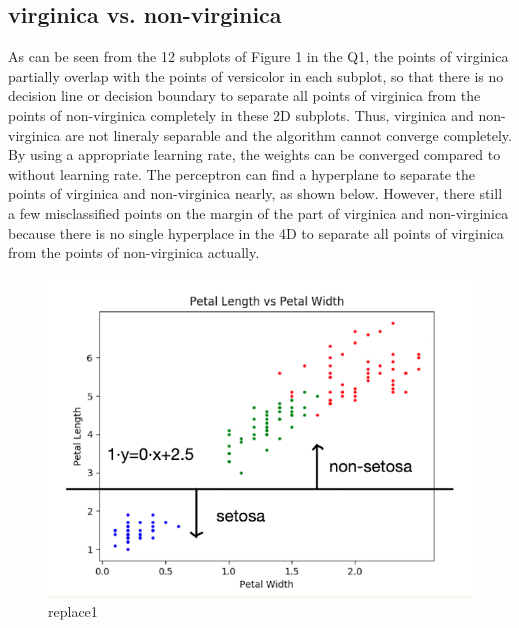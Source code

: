 \documentclass{article}
\begin{document}
\subsection{virginica vs. non-virginica}
As can be seen from the 12 subplots of Figure 1 in the Q1, the points of virginica partially overlap with the points of versicolor in each subplot, so that there is no decision line or decision boundary to separate all points of virginica from the points of non-virginica completely in these 2D subplots. Thus, virginica and non-virginica are not lineraly separable and the algorithm cannot converge completely.\\
By using a appropriate learning rate, the weights can be converged compared to without learning rate. The perceptron can find a hyperplane to separate the points of virginica and non-virginica nearly, as shown below. However, there still a few misclassified points on the margin of the part of virginica and non-virginica because there is no single hyperplace in the 4D to separate all points of virginica from the points of non-virginica actually.
\begin{figure}[H]
\centering
\includegraphics[scale=0.4]{PLvsPW.png}
\caption{replace1}
\end{figure}
\noindent
\end{document}
